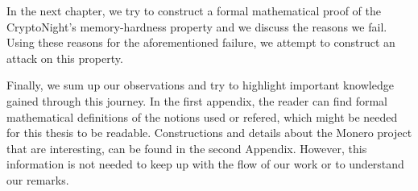 In the next chapter, we try to construct a formal mathematical proof of the CryptoNight's memory-hardness property and we discuss the reasons we fail. Using these reasons for the aforementioned failure, we attempt to construct an attack on this property.

Finally, we sum up our observations and try to highlight important knowledge gained through this journey. In the first appendix, the reader can find formal mathematical definitions of the notions used or refered, which might be needed for this thesis to be readable. Constructions and details about the Monero project that are interesting, can be found in the second Appendix. However, this information is not needed to keep up with the flow of our work or to understand our remarks.
